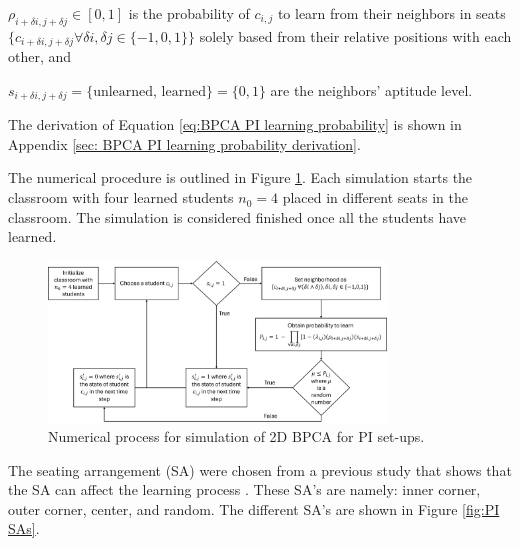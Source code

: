 $\rho_{i+\delta i, j+\delta j} \in [0,1]$ is the probability of $c_{i,j}$ to learn from their neighbors in seats $\lbrace c_{i+\delta i, j+\delta j} \forall \delta i, \delta j \in \lbrace -1,0,1 \rbrace \rbrace$ solely based from their relative positions with each other, and

$s_{i+\delta i, j+\delta j} = \lbrace\text{unlearned, learned}\rbrace=\lbrace 0,1 \rbrace$ are the neighbors' aptitude level.

The derivation of Equation \ref{eq:BPCA PI learning probability} is shown in Appendix \ref{sec: BPCA PI learning probability derivation}.

The numerical procedure is outlined in Figure \ref{fig:2DBPCA PI Flowchart}. 
Each simulation starts the classroom with four learned students $n_0 = 4$ placed in different seats in the classroom. 
The simulation is considered finished once all the students have learned.

\begin{figure}[htbp!]
    \centering
    \includegraphics[width=0.8\textwidth]{figures/2DBPCA PI Flowchart.png}
    \caption[Peer instruction flowchart]{Numerical process for simulation of 2D BPCA for PI set-ups.}
    \label{fig:2DBPCA PI Flowchart}
\end{figure}

The seating arrangement (SA) were chosen from a previous study that shows that the SA can affect the learning process \cite{roxas2010seating}. 
These SA's are namely: inner corner, outer corner, center, and random. The different SA's are shown in Figure \ref{fig:PI SAs}.

